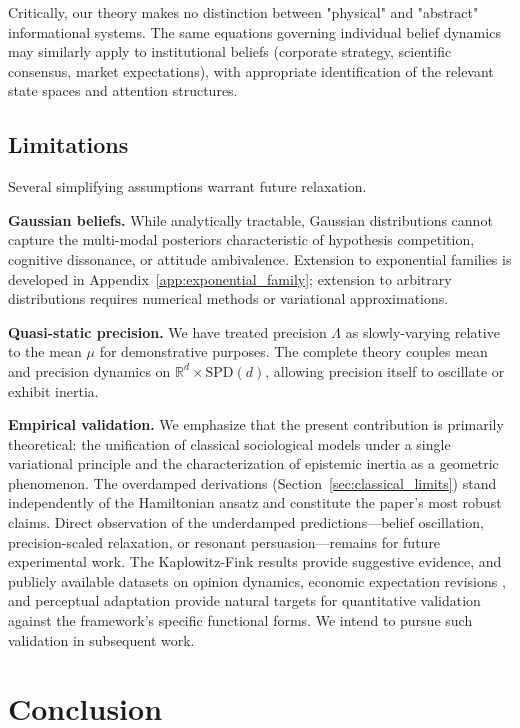\documentclass[12pt]{article}
\begin{document}
Critically, our theory makes no distinction between "physical" and "abstract" informational systems. The same equations governing individual belief dynamics may similarly apply to institutional beliefs (corporate strategy, scientific consensus, market expectations), with appropriate identification of the relevant state spaces and attention structures.

\subsection{Limitations}

Several simplifying assumptions warrant future relaxation.

\textbf{Gaussian beliefs.} While analytically tractable, Gaussian distributions cannot capture the multi-modal posteriors characteristic of hypothesis competition, cognitive dissonance, or attitude ambivalence. Extension to exponential families is developed in Appendix~\ref{app:exponential_family}; extension to arbitrary distributions requires numerical methods or variational approximations.

\textbf{Quasi-static precision.} We have treated precision $\Lambda$ as slowly-varying relative to the mean $\mu$ for demonstrative purposes. The complete theory couples mean and precision dynamics on $\mathbb{R}^d \times \mathrm{SPD}(d)$, allowing precision itself to oscillate or exhibit inertia.

\textbf{Empirical validation.} We emphasize that the present contribution is primarily theoretical: the unification of classical sociological models under a single variational principle and the characterization of epistemic inertia as a geometric phenomenon. The overdamped derivations (Section~\ref{sec:classical_limits}) stand independently of the Hamiltonian ansatz and constitute the paper's most robust claims. Direct observation of the underdamped predictions---belief oscillation, precision-scaled relaxation, or resonant persuasion---remains for future experimental work. The Kaplowitz-Fink results \citep{kaplowitz1983, fink2002} provide suggestive evidence, and publicly available datasets on opinion dynamics, economic expectation revisions \citep{coibion2015}, and perceptual adaptation provide natural targets for quantitative validation against the framework's specific functional forms. We intend to pursue such validation in subsequent work.



\section{Conclusion}
\end{document}
